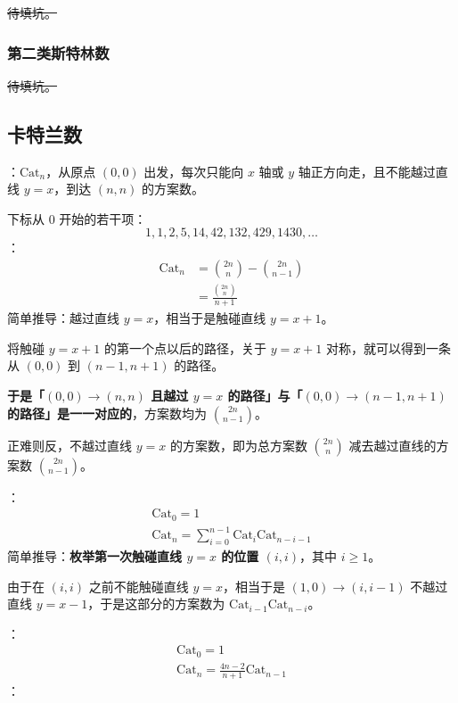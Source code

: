 \sout{待填坑。}

\subsubsection{第二类斯特林数}

\sout{待填坑。}

\subsection{卡特兰数}

：$\mathrm{Cat}_n$，从原点 $(0, 0)$ 出发，每次只能向 $x$ 轴或 $y$ 轴正方向走，且不能越过直线 $y = x$，到达 $(n, n)$ 的方案数。

下标从 $0$ 开始的若干项：
\[
1, 1, 2, 5, 14, 42, 132, 429, 1430, \dots
\]
：
\[
\begin{aligned}
\mathrm{Cat}_n & = \binom{2n}{n} - \binom{2n}{n - 1} \\
& = \frac{\binom{2n}{n}}{n + 1}
\end{aligned}
\]
简单推导：越过直线 $y = x$，相当于是触碰直线 $y = x + 1$。

将触碰 $y = x + 1$ 的第一个点以后的路径，关于 $y = x + 1$ 对称，就可以得到一条从 $(0, 0)$ 到 $(n - 1, n + 1)$ 的路径。

\textbf{于是「$(0, 0) \to (n, n)$ 且越过 $y = x$ 的路径」与「$(0, 0) \to (n - 1, n + 1)$ 的路径」是一一对应的}，方案数均为 $\binom{2n}{n - 1}$。

正难则反，不越过直线 $y = x$ 的方案数，即为总方案数 $\binom{2n}{n}$ 减去越过直线的方案数 $\binom{2n}{n - 1}$。

：
\[
\begin{gathered}
\mathrm{Cat}_0 = 1 \\
\mathrm{Cat}_n = \sum_{i = 0}^{n - 1}\mathrm{Cat}_i\mathrm{Cat}_{n - i - 1}
\end{gathered}
\]
简单推导：\textbf{枚举第一次触碰直线 $y = x$ 的位置 $(i, i)$}，其中 $i \geq 1$。

由于在 $(i, i)$ 之前不能触碰直线 $y = x$，相当于是 $(1, 0) \to (i, i - 1)$ 不越过直线 $y = x - 1$，于是这部分的方案数为 $\mathrm{Cat}_{i - 1}\mathrm{Cat}_{n - i}$。

：
\[
\begin{gathered}
\mathrm{Cat}_0 = 1\\
\mathrm{Cat}_n = \frac{4n - 2}{n + 1}\mathrm{Cat}_{n - 1}
\end{gathered}
\]
：

